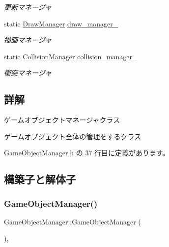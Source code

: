 \begin{DoxyCompactItemize}
\begin{DoxyCompactList}\small\item\em 更新マネージャ \end{DoxyCompactList}\item 
static \mbox{\hyperlink{class_draw_manager}{Draw\+Manager}} \mbox{\hyperlink{class_game_object_manager_afad3b0a750982e55d71edd72b440c724}{draw\+\_\+manager\+\_\+}}
\begin{DoxyCompactList}\small\item\em 描画マネージャ \end{DoxyCompactList}\item 
static \mbox{\hyperlink{class_collision_manager}{Collision\+Manager}} \mbox{\hyperlink{class_game_object_manager_a3a173415abbd4acbe2abaf40e0a6c1b8}{collision\+\_\+manager\+\_\+}}
\begin{DoxyCompactList}\small\item\em 衝突マネージャ \end{DoxyCompactList}\end{DoxyCompactItemize}


\subsection{詳解}
ゲームオブジェクトマネージャクラス 

ゲームオブジェクト全体の管理をするクラス 

 Game\+Object\+Manager.\+h の 37 行目に定義があります。



\subsection{構築子と解体子}
\mbox{\label{class_game_object_manager_aa5693c4aefc135e5e85140427c781d3e}} 
\subsubsection{\texorpdfstring{Game\+Object\+Manager()}{GameObjectManager()}\hspace{0.1cm}{\footnotesize\ttfamily [1/2]}}
{\footnotesize\ttfamily Game\+Object\+Manager\+::\+Game\+Object\+Manager (\begin{DoxyParamCaption}{ }\end{DoxyParamCaption})\hspace{0.3cm}{\ttfamily [private]}, {\ttfamily [delete]}}




